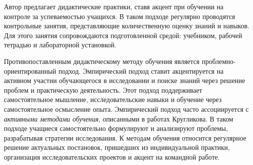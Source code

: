 Автор предлагает дидактические практики, ставя акцент при обучении на контроле за успеваемостью учащихся.
В таком подходе  регулярно проводятся контрольные занятия, представляющие количественную оценку знаний и навыков.
Для этого занятия сопровождаются подготовленной средой: учебником, рабочей тетрадью и лабораторной установкой.

Противопоставленным дидактическому методу обучения является проблемно-ориентированный подход.
Эмпирический подход ставит акцентируется на активном участии обучающегося в исследовании
и поиске знаний через решение проблем и практическую деятельность.
Этот подход поддерживает самостоятельное мышление, исследовательские навыки и обучение через самостоятельное осмысление опыта.
Эмпирический подход часто ассоциируется с \textit{активными методами обучения}, описанными в работах Кругликова. \cite{кругликов2006деловые}
В таком подходе учащиеся самостоятельно формулируют и анализируют проблемы, разрабатывая стратегии исследования.
К  методам обучения относится регулярное решение актуальных постановок, пришедших из индивидуальной практики, организация исследовательских проектов и
акцент на командной работе.

